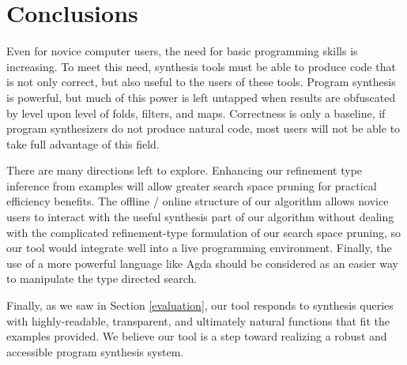 \section{Conclusions}
\label{conclusions}
Even for novice computer users, the need for basic programming skills is increasing. To meet this need, synthesis tools must be able to produce code that is not only correct, but also useful to the users of these tools. Program synthesis is powerful, but much of this power is left untapped when results are obfuscated by level upon level of folds, filters, and maps. Correctness is only a baseline, if program synthesizers do not produce natural code, most users will not be able to take full advantage of this field.

There are many directions left to explore. Enhancing our refinement type inference from examples will allow greater search space pruning for practical efficiency benefits. The offline / online structure of our algorithm allows novice users to interact with the useful synthesis part of our algorithm without dealing with the complicated refinement-type formulation of our search space pruning, so our tool would integrate well into a live programming environment. Finally, the use of a more powerful language like Agda should be considered as an easier way to manipulate the type directed search.

Finally, as we saw in Section \ref{evaluation}, our tool responds to synthesis queries with highly-readable, transparent, and ultimately natural functions that fit the examples provided. We believe our tool is a step toward realizing a robust and accessible program synthesis system.
